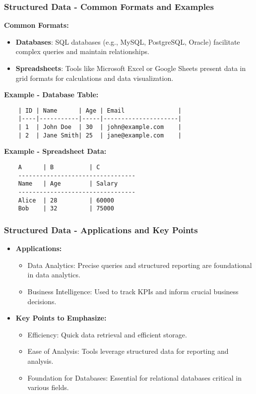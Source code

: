 \documentclass{beamer}
\begin{document}
\begin{frame}[fragile]
    \frametitle{Structured Data - Common Formats and Examples}

    \textbf{Common Formats:}
    \begin{itemize}
        \item \textbf{Databases}: SQL databases (e.g., MySQL, PostgreSQL, Oracle) facilitate complex queries and maintain relationships.
        \item \textbf{Spreadsheets}: Tools like Microsoft Excel or Google Sheets present data in grid formats for calculations and data visualization.
    \end{itemize}
    
    \textbf{Example - Database Table:}
    \begin{lstlisting}
    | ID | Name      | Age | Email               |
    |----|-----------|-----|---------------------|
    | 1  | John Doe  | 30  | john@example.com    |
    | 2  | Jane Smith| 25  | jane@example.com    |
    \end{lstlisting}
    
    \textbf{Example - Spreadsheet Data:}
    \begin{lstlisting}
    A      | B          | C
    ---------------------------------
    Name   | Age        | Salary
    ---------------------------------
    Alice  | 28         | 60000
    Bob    | 32         | 75000
    \end{lstlisting}
\end{frame}

\begin{frame}[fragile]
    \frametitle{Structured Data - Applications and Key Points}

    \begin{itemize}
        \item \textbf{Applications:}
        \begin{itemize}
            \item Data Analytics: Precise queries and structured reporting are foundational in data analytics.
            \item Business Intelligence: Used to track KPIs and inform crucial business decisions.
        \end{itemize}
        
        \item \textbf{Key Points to Emphasize:}
        \begin{itemize}
            \item Efficiency: Quick data retrieval and efficient storage.
            \item Ease of Analysis: Tools leverage structured data for reporting and analysis.
            \item Foundation for Databases: Essential for relational databases critical in various fields.
        \end{itemize}
    \end{itemize}
\end{frame}
\end{document}
